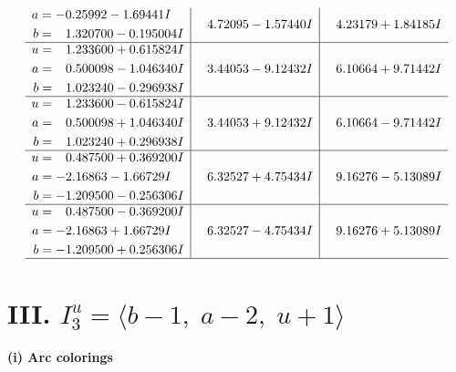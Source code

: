\documentclass[1p]{elsarticle_modified}
\theoremstyle{definition}
\begin{document}
$$\begin{array}{c|c|c}
\begin{aligned}
a &= -0.25992 - 1.69441 I \\
b &= \phantom{-}1.320700 - 0.195004 I\end{aligned}
 & \phantom{-}4.72095 - 1.57440 I & \phantom{-}4.23179 + 1.84185 I \\ \hline\begin{aligned}
u &= \phantom{-}1.233600 + 0.615824 I \\
a &= \phantom{-}0.500098 - 1.046340 I \\
b &= \phantom{-}1.023240 - 0.296938 I\end{aligned}
 & \phantom{-}3.44053 - 9.12432 I & \phantom{-}6.10664 + 9.71442 I \\ \hline\begin{aligned}
u &= \phantom{-}1.233600 - 0.615824 I \\
a &= \phantom{-}0.500098 + 1.046340 I \\
b &= \phantom{-}1.023240 + 0.296938 I\end{aligned}
 & \phantom{-}3.44053 + 9.12432 I & \phantom{-}6.10664 - 9.71442 I \\ \hline\begin{aligned}
u &= \phantom{-}0.487500 + 0.369200 I \\
a &= -2.16863 - 1.66729 I \\
b &= -1.209500 - 0.256306 I\end{aligned}
 & \phantom{-}6.32527 + 4.75434 I & \phantom{-}9.16276 - 5.13089 I \\ \hline\begin{aligned}
u &= \phantom{-}0.487500 - 0.369200 I \\
a &= -2.16863 + 1.66729 I \\
b &= -1.209500 + 0.256306 I\end{aligned}
 & \phantom{-}6.32527 - 4.75434 I & \phantom{-}9.16276 + 5.13089 I\\
 \hline 
 \end{array}$$\newpage\newpage\renewcommand{\arraystretch}{1}
\centering \section*{III. $I^u_{3}= \langle b-1,\;a-2,\;u+1 \rangle$}
\flushleft \textbf{(i) Arc colorings}\\
\end{document}
